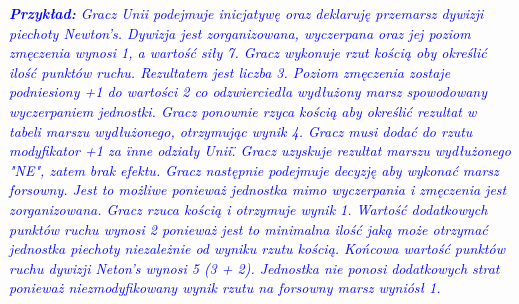 \textcolor{blue}{\textit{\textbf{Przykład:} Gracz Unii podejmuje inicjatywę oraz deklaruję przemarsz dywizji piechoty Newton's. Dywizja jest zorganizowana, wyczerpana oraz jej poziom zmęczenia wynosi 1, a wartość siły 7. Gracz wykonuje rzut kością oby określić ilość punktów ruchu. Rezultatem jest liczba 3. Poziom zmęczenia zostaje podniesiony +1 do wartości 2 co odzwierciedla wydłużony marsz spowodowany wyczerpaniem jednostki. Gracz ponownie rzyca kością aby określić rezultat w tabeli marszu wydłużonego, otrzymując wynik 4. Gracz musi dodać do rzutu modyfikator +1 za \"inne odziały Unii\". Gracz uzyskuje rezultat marszu wydłużonego "NE", zatem brak efektu. Gracz następnie podejmuje decyzję aby wykonać marsz forsowny. Jest to możliwe ponieważ jednostka mimo wyczerpania i zmęczenia jest zorganizowana. Gracz rzuca kością i otrzymuje wynik 1. Wartość dodatkowych punktów ruchu wynosi 2 ponieważ jest to minimalna ilość jaką może otrzymać jednostka piechoty niezależnie od wyniku rzutu kością. Końcowa wartość punktów ruchu dywizji Neton's wynosi 5 (3 + 2). Jednostka nie ponosi dodatkowych strat ponieważ niezmodyfikowany wynik rzutu na forsowny marsz wyniósł 1.}}


